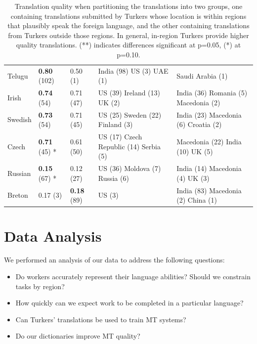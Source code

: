 \documentclass[11pt]{article}
\begin{document}
\begin{table}
\begin{center}
\begin{tabular}{lllll}
Telugu & \textbf{0.80} (102) & 0.50 (1) & India (98) US (3) UAE (1)  & Saudi Arabia (1)  \\
Irish & \textbf{0.74} (54) & 0.71 (47) & US (39) Ireland (13) UK (2)  & India (36) Romania (5) Macedonia (2)  \\
Swedish & \textbf{0.73} (54) & 0.71 (45) & US (25) Sweden (22) Finland (3)  & India (23) Macedonia (6) Croatia (2)  \\
Czech & \textbf{0.71} (45) * & 0.61 (50) & US (17) Czech Republic (14) Serbia (5)  & Macedonia (22) India (10) UK (5)  \\
Russian & \textbf{0.15} (67) * & 0.12 (27) & US (36) Moldova (7) Russia (6)  & India (14) Macedonia (4) UK (3)  \\
Breton & 0.17 (3) & \textbf{0.18} (89) & US (3)  & India (83) Macedonia (2) China (1) \\
\hline\hline
\end{tabular}
\normalsize
\end{center}
\caption{Translation quality when partitioning the translations into two groups, one containing translations submitted by Turkers whose location is within regions that plausibly speak the foreign language, and the other containing translations from Turkers outside those regions. In general, in-region Turkers provide higher quality translations. (**) indicates differences significant at p=0.05, (*) at p=0.10.} \label{region-summary}
\end{table}

\section{Data Analysis} \label{sec:data-analysis}

We performed an analysis of our data to address the following questions:
\begin{itemize}
\item Do workers accurately represent their language abilities?  Should we constrain tasks by region? 
\item How quickly can we expect work to be completed in a particular language? 
\item Can Turkers' translations be used to train MT systems? 
\item Do our dictionaries improve MT quality?
\end{itemize}
\end{document}
